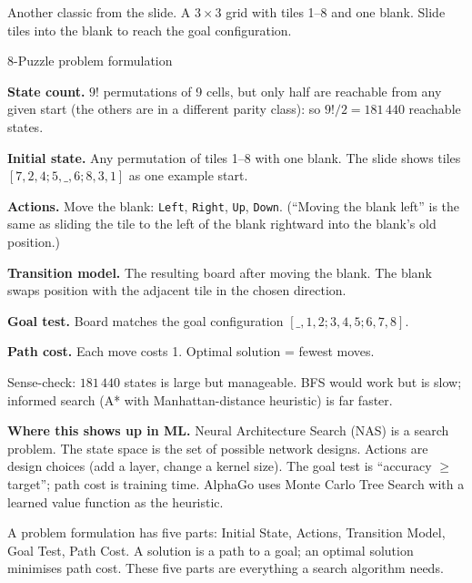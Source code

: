 \documentclass[a4paper,11pt]{article}
\begin{document}
Another classic from the slide. A $3 \times 3$ grid with tiles 1--8 and one
blank. Slide tiles into the blank to reach the goal configuration.

\begin{worked}{8-Puzzle problem formulation}
\begin{steps}
  \item \textbf{State count.}
        $9!$ permutations of 9 cells, but only half are reachable from any
        given start (the others are in a different parity class): so
        $9!/2 = 181\,440$ reachable states.
  \item \textbf{Initial state.} Any permutation of tiles 1--8 with one blank.
        The slide shows tiles $[7,2,4; 5,\_,6; 8,3,1]$ as one example start.
  \item \textbf{Actions.} Move the blank: \texttt{Left}, \texttt{Right},
        \texttt{Up}, \texttt{Down}.
        (``Moving the blank left'' is the same as sliding the tile to the left
        of the blank rightward into the blank's old position.)
  \item \textbf{Transition model.} The resulting board after moving the blank.
        The blank swaps position with the adjacent tile in the chosen direction.
  \item \textbf{Goal test.} Board matches the goal configuration
        $[\_,1,2; 3,4,5; 6,7,8]$.
  \item \textbf{Path cost.} Each move costs 1. Optimal solution = fewest moves.
\end{steps}
Sense-check: $181\,440$ states is large but manageable. BFS would work but is
slow; informed search (A* with Manhattan-distance heuristic) is far faster.
\end{worked}

\textbf{Where this shows up in ML.}
Neural Architecture Search (NAS) is a search problem.
The state space is the set of possible network designs.
Actions are design choices (add a layer, change a kernel size).
The goal test is ``accuracy $\geq$ target''; path cost is training time.
AlphaGo uses Monte Carlo Tree Search with a learned value function as the heuristic.

\begin{keytake}
A problem formulation has five parts: Initial State, Actions, Transition Model,
Goal Test, Path Cost. A solution is a path to a goal; an optimal solution
minimises path cost. These five parts are everything a search algorithm needs.
\end{keytake}
\end{document}
